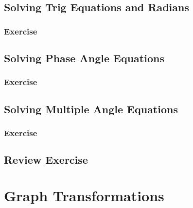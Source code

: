 \documentclass[
  11pt,
  openany]{book}
\begin{document}
\newpage

\section{Solving Trig Equations and Radians}\label{solving-trig-equations-and-radians}

\newpage

\subsection*{Exercise}\label{exercise-29}

\newpage

\section{Solving Phase Angle Equations}\label{solving-phase-angle-equations}

\newpage

\subsection*{Exercise}\label{exercise-30}

\newpage

\section{Solving Multiple Angle Equations}\label{solving-multiple-angle-equations}

\newpage

\subsection*{Exercise}\label{exercise-31}

\newpage

\section{Review Exercise}\label{review-exercise-5}

\chapterfont{\color{white}}

\chapter{Graph Transformations}\label{graph-transformations}
\end{document}
